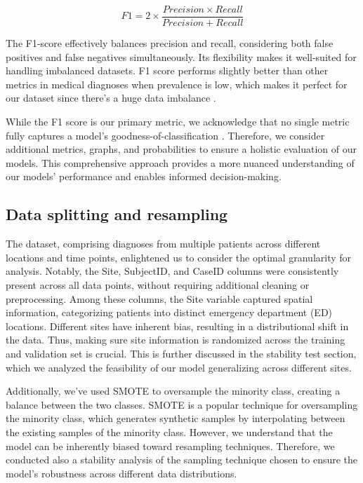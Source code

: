 \documentclass[10pt,letterpaper]{article}
\begin{document}
\begin{equation}
    F1 = 2 \times \frac{Precision \times Recall}{Precision + Recall}
\end{equation}

The F1-score effectively balances precision and recall, considering both false positives and false negatives simultaneously. Its flexibility makes it well-suited for handling imbalanced datasets. F1 score performs slightly better than other metrics in medical diagnoses when prevalence is low, which makes it perfect for our dataset since there's a huge data imbalance \cite{hicks2022evaluation}.

While the F1 score is our primary metric, we acknowledge that no single metric fully captures a model's goodness-of-classification \cite{hicks2022evaluation}. Therefore, we consider additional metrics, graphs, and probabilities to ensure a holistic evaluation of our models. This comprehensive approach provides a more nuanced understanding of our models' performance and enables informed decision-making.

\subsection{Data splitting and resampling}

The dataset, comprising diagnoses from multiple patients across different locations and time points, enlightened us to 
consider the optimal granularity for analysis. Notably, the Site, SubjectID, and CaseID columns were consistently present 
across all data points, without requiring additional cleaning or preprocessing. Among these columns, the Site variable 
captured spatial information, categorizing patients into distinct emergency department (ED) locations. Different sites 
have inherent bias, resulting in a distributional shift in the data. 
Thus, making sure site information is randomized across the training and validation set is crucial. This is further 
discussed in the stability test section, which we analyzed the feasibility of our model generalizing across different sites.

Additionally, we've used SMOTE to oversample the minority class, creating a balance between the two classes. 
SMOTE is a popular technique for oversampling the minority class, which generates synthetic samples by interpolating 
between the existing samples of the minority class. However, we understand that the model can be inherently biased 
toward resampling techniques. Therefore, we conducted also a stability analysis of the sampling technique chosen to 
ensure the model's robustness across different data distributions.
\end{document}
